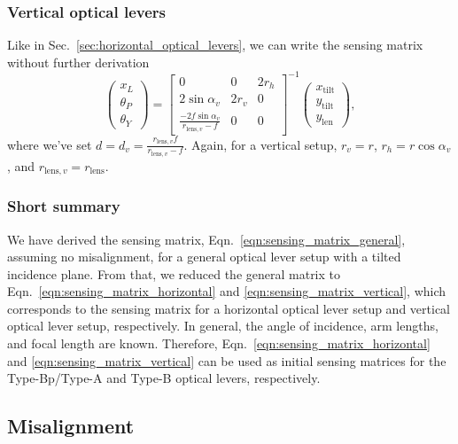 \subsubsection{Vertical optical levers}
Like in Sec.~\ref{sec:horizontal_optical_levers}, we can write the sensing matrix without further derivation
\begin{equation}
	\begin{pmatrix}
		x_L\\
		\theta_P\\
		\theta_Y
	\end{pmatrix}
	=
	\begin{bmatrix}
		0 & 0 & 2r_h\\
		2\sin\alpha_v & 2r_v & 0\\
		\frac{-2f\sin\alpha_v}{r_{\mathrm{lens},v}-f} & 0 & 0
	\end{bmatrix}^{-1}
	\begin{pmatrix}
		x_\mathrm{tilt}\\
		y_\mathrm{tilt}\\
		y_\mathrm{len}
	\end{pmatrix},
	\label{eqn:sensing_matrix_vertical}
\end{equation}
where we've set $d=d_v=\frac{r_{\mathrm{lens},v}f}{r_{\mathrm{lens},v}-f}$.
Again, for a vertical setup, $r_v=r$, $r_h=r\cos\alpha_v$, and $r_{\mathrm{lens},v}=r_\mathrm{lens}$.

\subsubsection{Short summary}
We have derived the sensing matrix, Eqn.~\eqref{eqn:sensing_matrix_general}, assuming no misalignment, for a general optical lever setup with a tilted incidence plane.
From that, we reduced the general matrix to Eqn.~\eqref{eqn:sensing_matrix_horizontal} and \eqref{eqn:sensing_matrix_vertical}, which corresponds to the sensing matrix for a horizontal optical lever setup and vertical optical lever setup, respectively.
In general, the angle of incidence, arm lengths, and focal length are known.
Therefore, Eqn.~\eqref{eqn:sensing_matrix_horizontal} and \eqref{eqn:sensing_matrix_vertical} can be used as initial sensing matrices for the Type-Bp/Type-A and Type-B optical levers, respectively.


\subsection{Misalignment}

